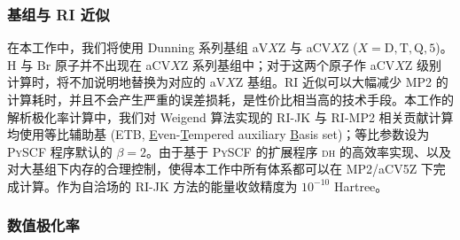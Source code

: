 \subsubsection{基组与 RI 近似}

在本工作中，我们将使用 Dunning 系列基组 aV$X$Z 与 aCV$X$Z ($X = \mathrm{D, T, Q, 5}$)\cite{Dunning-Dunning.JCP.1989, Kendall-Harrison.JCP.1992, Woon-Dunning.JCP.1993, Peterson-Dunning.JCP.1994, Wilson-Dunning.JMST.1996, VanMourik-Dunning.MP.1999, Wilson-Dunning.JCP.1999, VanMourik-Dunning.IJQC.2000, Peterson-Dunning.JCP.2002, Hill-Peterson.JCP.2010}。H 与 Br 原子并不出现在 aCV$X$Z 系列基组中；对于这两个原子作 aCV$X$Z 级别计算时，将不加说明地替换为对应的 aV$X$Z 基组。RI 近似可以大幅减少 MP2 的计算耗时，并且不会产生严重的误差损耗，是性价比相当高的技术手段\cite{Vahtras-Feyereisen.CPL.1993}。本工作的解析极化率计算中，我们对 Weigend 算法实现的 RI-JK\cite{Weigend-Weigend.PCCP.2002} 与 RI-MP2 相关贡献\cite{Weigend-Haettig.JCP.2002}计算均使用等比辅助基 (ETB, \underline{E}ven-\underline{T}empered auxiliary \underline{B}asis set)\cite{Stoychev-Neese.JCTC.2017}；等比参数设为 \textsc{PySCF} 程序默认的 $\beta = 2$。由于基于 \textsc{PySCF} 的扩展程序 \textsc{dh} 的高效率实现、以及对大基组下内存的合理控制，使得本工作中所有体系都可以在 MP2/aCV5Z 下完成计算。作为自洽场的 RI-JK 方法的能量收敛精度为 $10^{-10}$ Hartree。

\subsubsection{数值极化率}

